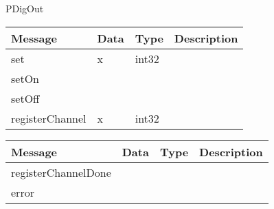  {PDigOut}

\begin{tabular}[ht]{|l|l|l|p{8cm}|}
\hline
Message & Data & Type & Description\\
\hline
set &  x  &  int32  & \\
\hline
setOn &  &  & \\
\hline
setOff &  &  & \\
\hline
registerChannel &  x  &  int32  & \\
\hline
\end{tabular}
\begin{tabular}[ht]{|l|l|l|p{8cm}|}
\hline
Message & Data & Type & Description\\
\hline
registerChannelDone &  &  & \\
\hline
error &  &  & \\
\hline
\end{tabular}
